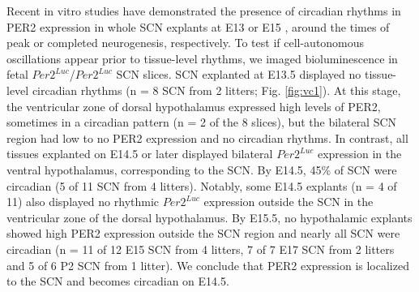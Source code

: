 Recent in vitro studies have demonstrated the presence of circadian rhythms in PER2 expression in whole SCN explants at E13 \cite{Landgraf2015} or E15 \cite{Wreschnig2014}, around the times of peak or completed neurogenesis, respectively.
To test if cell-autonomous oscillations appear prior to tissue-level rhythms, we imaged bioluminescence in fetal $Per2^{Luc}$/$Per2^{Luc}$ SCN slices.
SCN explanted at E13.5 displayed no tissue-level circadian rhythms (n = 8 SCN from 2 litters; Fig. 
\ref{fig:vc1}).
At this stage, the ventricular zone of dorsal hypothalamus expressed high levels of PER2, sometimes in a circadian pattern (n = 2 of the 8 slices), but the bilateral SCN region had low to no PER2 expression and no circadian rhythms.
In contrast, all tissues explanted on E14.5 or later displayed bilateral $Per2^{Luc}$ expression in the ventral hypothalamus, corresponding to the SCN.
By E14.5, 45\% of SCN were circadian (5 of 11 SCN from 4 litters).
Notably, some E14.5 explants (n = 4 of 11) also displayed no rhythmic $Per2^{Luc}$ expression outside the SCN in the ventricular zone of the dorsal hypothalamus.
By E15.5, no hypothalamic explants showed high PER2 expression outside the SCN region and nearly all SCN were circadian (n = 11 of 12 E15 SCN from 4 litters, 7 of 7 E17 SCN from 2 litters and 5 of 6 P2 SCN from 1 litter).
We conclude that PER2 expression is localized to the SCN and becomes circadian on E14.5.

